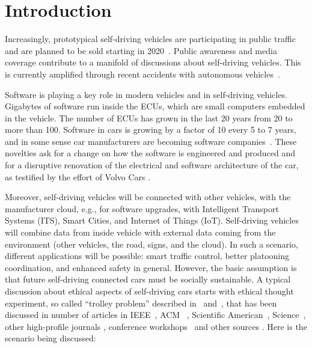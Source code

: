 \section{Introduction}


Increasingly, prototypical self-driving vehicles are participating in public traffic~\cite{Persson2014} and are planned to be sold starting in 2020~\cite{Toyota2015,Stoll_WSJ_2016}. Public awareness and media coverage contribute to a manifold of discussions about self-driving vehicles. This is currently amplified through recent accidents with autonomous vehicles~\cite{Tesla2016_tragicloss,Dolgov2016}. 

Software is playing a key role in modern vehicles and in self-driving vehicles. Gigabytes of software run inside the \acp{ECU}, which are small computers embedded in the vehicle. The number of \acp{ECU} has grown in the last 20 years from 20 to more than 100. Software in cars is growing by a factor of 10 every 5 to 7 years, and in some sense car manufacturers are becoming software companies~\cite{PELLICCIONE201783}. These novelties ask for a change on how the software is engineered and produced and for a disruptive renovation of the electrical and software architecture of the car, as testified by the effort of Volvo Cars \cite{PELLICCIONE201783}.

Moreover, self-driving vehicles will be connected with other vehicles, with the manufacturer cloud, e.g., for software upgrades, with Intelligent Transport Systems (ITS), Smart Cities, and Internet of Things (IoT). Self-driving vehicles will combine data from inside vehicle with external data coming from the environment (other vehicles, the road, signs, and the cloud). In such a scenario, different applications will be possible: smart traffic control, better platooning coordination, and enhanced safety in general.
However, the basic assumption is that future self-driving connected cars must be socially sustainable.
A typical discussion about ethical aspects of self-driving cars starts with ethical thought experiment, so called \enquote{trolley problem} described in~\cite{Foot1967} and~\cite{Wintersberger2017}, that has been discussed in number of articles in IEEE~\cite{7948873,Goodall2016,Ackerman2016}, ACM~ \cite{McBride:2016:EDC:2874239.2874265,Kirkpatrick:2015:MCD:2808213.2788477,Frison:2016:FPT:3004323.3004336}, Scientific American~\cite{Greenemeier2016,Deamer2016,Kuchinskas2013}, Science~\cite{Bonnefon2016,Greene2016_1514}, other high-profile journals \cite{2016arXiv160608813G_GoodmanFlaxman, Coca-Vila2017, goodall2014vehicle}, conference workshops~\cite{Riener:2016:WEI:3004323.3005687,Alavi:2017:DCW:3064857.3079155} and other sources \cite{MoralMachine2016,Mooney2016,Achenbach2015}. Here is the  scenario being discussed:

